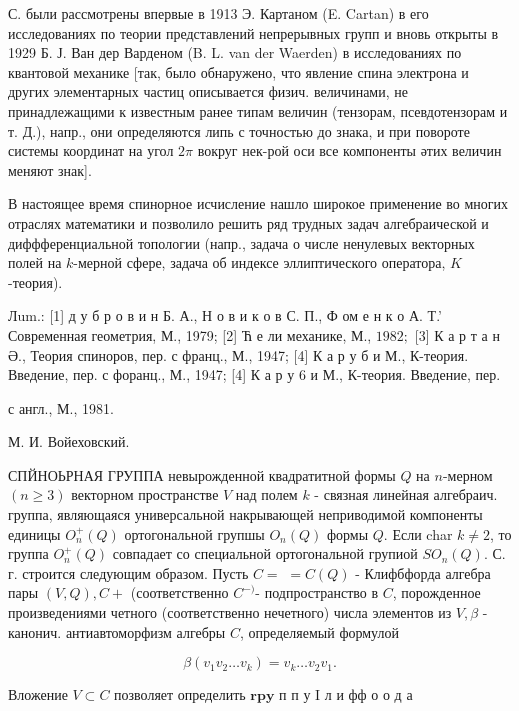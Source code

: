 \documentclass[10pt]{article}
\begin{document}
С. были рассмотрены впервые в 1913 Э. Картаном (E. Cartan) в его исследованиях по теории представлений непрерывных групп и вновь открыты в 1929 Б. Ј. Ван дер Варденом (B. L. van der Waerden) в исследованиях по квантовой механике [так, было обнаружено, что явление спина электрона и других элементарных частиц описывается физич. величинами, не принадлежащими к известным ранее типам величин (тензорам, псевдотензорам и т. Д.), напр., они определяются липь с точностью до знака, и при повороте системы координат на угол $2 \pi$ вокруг нек-рой оси все компоненты әтих величин меняют знак].



В настоящее время спинорное исчисление нашло широкое применение во многих отраслях математики и позволило решить ряд трудных задач алгебраической и диффференциальной топологии (напр., задача о числе ненулевых векторных полей на $k$-мерной сфере, задача об индексе эллиптического оператора, $K$-теория).



Лum.: [1] д у б р о в и н Б. А., Н о в и к о в С. П., Ф ом е н к о А. Т.' Современная геометрия, М., 1979; [2] Ћ е ли механике, М., $1982 ;$ [3] К а р т а н Ә., Теория спиноров, пер. с франц., М., 1947; [4] К а р у б и М., К-теория. Введение, пер. с форанц., М., 1947; [4] К а р у 6 и М., К-теория. Введение, пер.

с англ., М., 1981.

М. И. Войеховский.



СПЙНОЬРНАЯ ГРУППА невырожденной квадратитной формы $Q$ на $n$-мерном $(n \geqslant 3)$ векторном пространстве $V$ над полем $k$ - связная линейная алгебраич. группа, являющаяся универсальной накрывающей неприводимой компоненты единицы $O_{n}^{+}(Q)$ ортогональной групшы $O_{n}(Q)$ формы $Q$. Если char $k \neq 2$, то группа $O_{n}^{+}(Q)$ совпадает со специальной ортогональной групиой $S O_{n}(Q)$. С. г. строится следующим образом. Пусть $C=$ $=C(Q)$ - Клифбфорда алгебра пары $(V, Q), C+$ (соответственно $C^{-)}$- подпространство в $C$, порожденное произведениями четного (соответственно нечетного) числа элементов из $V, \beta$ - канонич. антиавтоморфизм алгебры $C$, определяемый формулой



\[

\beta\left(v_{1} v_{2} \ldots v_{k}\right)=v_{k} \ldots v_{2} v_{1} .

\]



Вложение $V \subset C$ позволяет определить $\mathbf{r} \mathbf{p} \mathbf{y}$ п п у I л и фф о о д а
\end{document}
